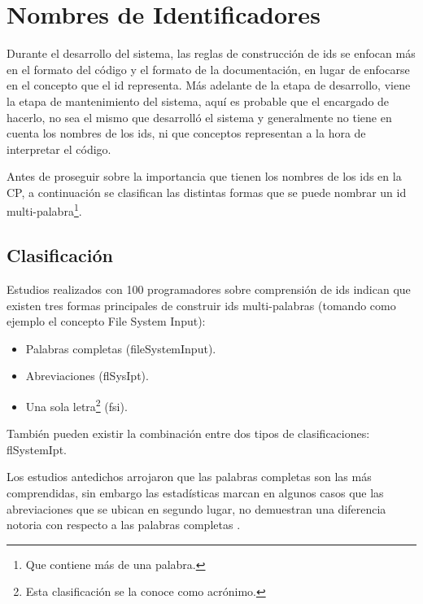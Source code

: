\pagebreak
\section{Nombres de Identificadores}

Durante el desarrollo del sistema, las reglas de construcción de ids se enfocan más en el formato del código y el formato de la documentación, en lugar de enfocarse en el concepto que el id representa. Más adelante de la etapa de desarrollo, viene la etapa de mantenimiento del sistema, aquí es probable que el encargado de hacerlo, no sea el mismo que desarrolló el sistema y generalmente no tiene en cuenta los nombres de los ids, ni que conceptos representan a la hora de interpretar el código.


Antes de proseguir sobre la importancia que tienen los nombres de los ids en la CP, a continuación se clasifican las distintas formas que se puede nombrar un id multi-palabra\footnote[1]{Que contiene más de una palabra.}.

\subsection{Clasificación}
\label{sec:clasif}%

Estudios realizados con 100 programadores \cite{DCHD06} sobre comprensión de ids indican que existen tres formas principales de construir ids multi-palabras (tomando como ejemplo el concepto \textsf{File System Input}): 

\begin{itemize}
\itemsep0em%
\item Palabras completas (\textsf{fileSystemInput}).
\item Abreviaciones (\textsf{flSysIpt}).
\item Una sola letra\footnote[2]{Esta clasificación se la conoce como acrónimo.} (\textsf{fsi}). 
\end{itemize}

También pueden existir la combinación entre dos tipos de clasificaciones: \textsf{flSystemIpt}.

Los estudios antedichos arrojaron que las palabras completas son las más comprendidas, sin embargo las estadísticas marcan en algunos casos que las abreviaciones que se ubican en segundo lugar, no demuestran una diferencia notoria con respecto a las palabras completas \cite{DCHD06}.

